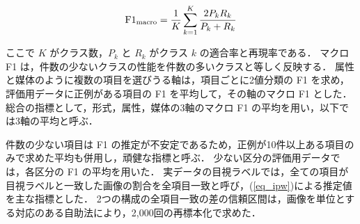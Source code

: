 \begin{equation}
    {\rm F1}_{\rm macro} = \frac{1}{K} \sum_{k=1}^{K} \frac{2 P_k R_k}{P_k + R_k}
    \label{eq_macro_f1}
\end{equation}

\noindent
ここで $ K $ がクラス数，$ P_k $ と $ R_k $ がクラス $ k $ の適合率と再現率である．
マクロ F1 は，件数の少ないクラスの性能を件数の多いクラスと等しく反映する．
属性と媒体のように複数の項目を選びうる軸は，項目ごとに2値分類の F1 を求め，評価用データに正例がある項目の F1 を平均して，その軸のマクロ F1 とした．
総合の指標として，形式，属性，媒体の3軸のマクロ F1 の平均を用い，以下では3軸の平均と呼ぶ．

件数の少ない項目は F1 の推定が不安定であるため，正例が10件以上ある項目のみで求めた平均も併用し，頑健な指標と呼ぶ．
少ない区分の評価用データでは，各区分の F1 の平均を用いた．
実データの目視ラベルでは，全ての項目が目視ラベルと一致した画像の割合を全項目一致と呼び，(\ref{eq_ipw})による推定値を主な指標とした．
2つの構成の全項目一致の差の信頼区間は，画像を単位とする対応のある自助法により，2,000回の再標本化で求めた．
